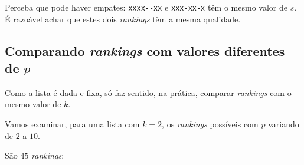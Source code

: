 \documentclass[
  letterpaper,
  DIV=11,
  numbers=noendperiod]{scrreprt}
\begin{document}
Perceba que pode haver empates: \texttt{xxxx-\/-xx} e \texttt{xxx-xx-x}
têm o mesmo valor de $s$. É razoável achar que estes dois
\emph{rankings} têm a mesma qualidade.

\subsection{\texorpdfstring{Comparando \emph{rankings} com valores
diferentes de
$p$}{Comparando rankings com valores diferentes de }}\label{comparando-rankings-com-valores-diferentes-de-p}

Como a lista é dada e fixa, só faz sentido, na prática, comparar
\emph{rankings} com o mesmo valor de $k$.

Vamos examinar, para uma lista com $k = 2$, os \emph{rankings} possíveis
com $p$ variando de $2$ a $10$.

São $45$ \emph{rankings}:
\end{document}
